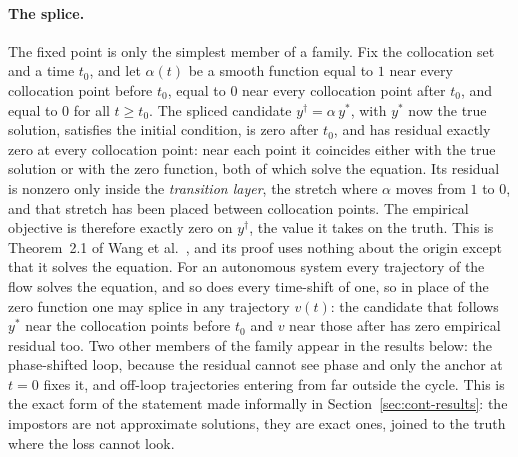 \documentclass[11pt,a4paper]{article}
\begin{document}
\paragraph{The splice.}
The fixed point is only the simplest member of a family. Fix the
collocation set and a time $t_0$, and let $\alpha(t)$ be a smooth
function equal to $1$ near every collocation point before $t_0$, equal
to $0$ near every collocation point after $t_0$, and equal to $0$ for
all $t \ge t_0$. The spliced candidate $y^{\dagger} = \alpha\, y^{\ast}$,
with $y^{\ast}$ now the true solution, satisfies the initial condition,
is zero after $t_0$, and has residual exactly zero at every collocation
point: near each point it coincides either with the true solution or
with the zero function, both of which solve the equation. Its residual
is nonzero only inside the \emph{transition layer}, the stretch where
$\alpha$ moves from $1$ to $0$, and that stretch has been placed between
collocation points. The empirical objective is therefore exactly zero on
$y^{\dagger}$, the value it takes on the truth. This is Theorem~2.1 of
Wang et al.~\cite{wang2026pseudo}, and its proof uses nothing about the
origin except that it solves the equation. For an autonomous system
every trajectory of the flow solves the equation, and so does every
time-shift of one, so in place of the zero function one may splice in
any trajectory $v(t)$: the candidate that follows $y^{\ast}$ near the
collocation points before $t_0$ and $v$ near those after has zero
empirical residual too. Two other members of the family appear in the
results below: the phase-shifted loop, because the residual cannot see
phase and only the anchor at $t = 0$ fixes it, and off-loop trajectories
entering from far outside the cycle. This is the exact form of the
statement made informally in Section~\ref{sec:cont-results}: the
impostors are not approximate solutions, they are exact ones, joined to
the truth where the loss cannot look.
\end{document}
